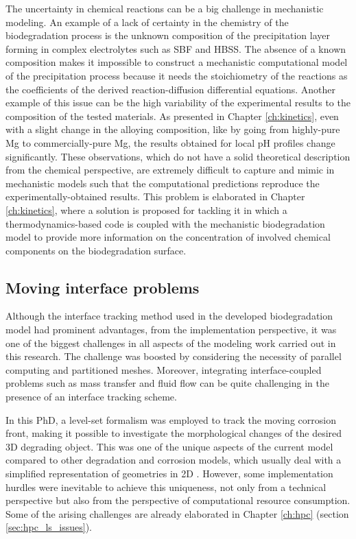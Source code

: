 The uncertainty in chemical reactions can be a big challenge in mechanistic modeling. An example of a lack of certainty in the chemistry of the biodegradation process is the unknown composition of the precipitation layer forming in complex electrolytes such as \gls{SBF} and \gls{HBSS}. The absence of a known composition makes it impossible to construct a mechanistic computational model of the precipitation process because it needs the stoichiometry of the reactions as the coefficients of the derived reaction-diffusion differential equations.  Another example of this issue can be the high variability of the experimental results to the composition of the tested materials. As presented in Chapter \ref{ch:kinetics}, even with a slight change in the alloying composition, like by going from highly-pure Mg to commercially-pure Mg, the results obtained for local pH profiles change significantly. These observations, which do not have a solid theoretical description from the chemical perspective, are extremely difficult to capture and mimic in mechanistic models such that the computational predictions reproduce the experimentally-obtained results. This problem is elaborated in Chapter \ref{ch:kinetics}, where a solution is proposed for tackling it in which a thermodynamics-based code is coupled with the mechanistic biodegradation model to provide more information on the concentration of involved chemical components on the biodegradation surface.

\subsection{Moving interface problems}

Although the interface tracking method used in the developed biodegradation model had prominent advantages, from the implementation perspective, it was one of the biggest challenges in all aspects of the modeling work carried out in this research. The challenge was boosted by considering the necessity of parallel computing and partitioned meshes. Moreover, integrating interface-coupled problems such as mass transfer and fluid flow can be quite challenging in the presence of an interface tracking scheme.

In this PhD, a level-set formalism was employed to track the moving corrosion front, making it possible to investigate the morphological changes of the desired 3D degrading object. This was one of the unique aspects of the current model compared to other degradation and corrosion models, which usually deal with a simplified representation of geometries in 2D \cite{Albaraghtheh2022}. However, some implementation hurdles were inevitable to achieve this uniqueness, not only from a technical perspective but also from the perspective of computational resource consumption. Some of the arising challenges are already elaborated in Chapter \ref{ch:hpc} (section \ref{sec:hpc_ls_issues}).

